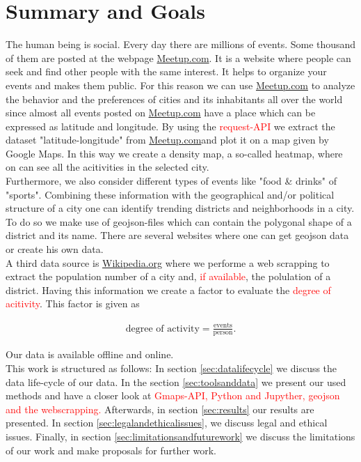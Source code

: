 \section{Summary and Goals}\label{sec:summaryandgoals}

The human being is social. Every day there are millions of events. Some thousand of them are posted at the webpage \url{Meetup.com}. It is a website where people can seek and find other people with the same interest. It helps to organize your events and makes them public. For this reason we can use \url{Meetup.com} to analyze the behavior and the preferences of cities and its inhabitants all over the world since almost all events posted on \url{Meetup.com} have a place which can be expressed as latitude and longitude. By using the \textcolor{red}{request-API} we extract the dataset "latitude-longitude" from \url{Meetup.com}and plot it on a map given by Google Maps. In this way we create a density map, a so-called heatmap, where on can see all the acitivities in the selected city.\\Furthermore, we also consider different types of events like "food \& drinks" of "sports". Combining these information with the geographical and/or political structure of a city one can identify trending districts and neighborhoods in a city. To do so we make use of geojson-files which can contain the polygonal shape of a district and its name. There are several websites where one can get geojson data or create his own data.\\A third data source is \url{Wikipedia.org} where we performe a web scrapping to extract the population number of a city and, \textcolor{red}{if available}, the polulation of a district. Having this information we create a factor to evaluate the \textcolor{red}{degree of acitivity}. This factor is given as

\begin{align*}
	\text{degree of activity} = \frac{\text{events}}{\text{person}}.
\end{align*}

Our data is available offline and online.\\This work is structured as follows: In section \ref{sec:datalifecycle} we discuss the data life-cycle of our data. In the section \ref{sec:toolsanddata} we present our used methods and have a closer look at \textcolor{red}{Gmaps-API, Python and Jupyther, geojson and the webscrapping.} Afterwards, in section \ref{sec:results} our results are presented. In section \ref{sec:legalandethicalissues}, we discuss legal and ethical issues. Finally, in section \ref{sec:limitationsandfuturework} we discuss the limitations of our work and make proposals for further work.